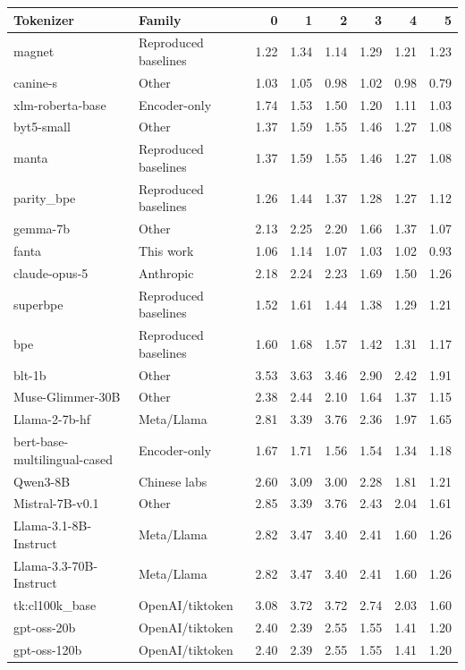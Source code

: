 \begin{tabular}{llrrrrrr}
\toprule
Tokenizer & Family & 0 & 1 & 2 & 3 & 4 & 5 \\
\midrule
magnet & Reproduced baselines & 1.22 & 1.34 & 1.14 & 1.29 & 1.21 & 1.23 \\
canine-s & Other & 1.03 & 1.05 & 0.98 & 1.02 & 0.98 & 0.79 \\
xlm-roberta-base & Encoder-only & 1.74 & 1.53 & 1.50 & 1.20 & 1.11 & 1.03 \\
byt5-small & Other & 1.37 & 1.59 & 1.55 & 1.46 & 1.27 & 1.08 \\
manta & Reproduced baselines & 1.37 & 1.59 & 1.55 & 1.46 & 1.27 & 1.08 \\
parity\_bpe & Reproduced baselines & 1.26 & 1.44 & 1.37 & 1.28 & 1.27 & 1.12 \\
gemma-7b & Other & 2.13 & 2.25 & 2.20 & 1.66 & 1.37 & 1.07 \\
fanta & This work & 1.06 & 1.14 & 1.07 & 1.03 & 1.02 & 0.93 \\
claude-opus-5 & Anthropic & 2.18 & 2.24 & 2.23 & 1.69 & 1.50 & 1.26 \\
superbpe & Reproduced baselines & 1.52 & 1.61 & 1.44 & 1.38 & 1.29 & 1.21 \\
bpe & Reproduced baselines & 1.60 & 1.68 & 1.57 & 1.42 & 1.31 & 1.17 \\
blt-1b & Other & 3.53 & 3.63 & 3.46 & 2.90 & 2.42 & 1.91 \\
Muse-Glimmer-30B & Other & 2.38 & 2.44 & 2.10 & 1.64 & 1.37 & 1.15 \\
Llama-2-7b-hf & Meta/Llama & 2.81 & 3.39 & 3.76 & 2.36 & 1.97 & 1.65 \\
bert-base-multilingual-cased & Encoder-only & 1.67 & 1.71 & 1.56 & 1.54 & 1.34 & 1.18 \\
Qwen3-8B & Chinese labs & 2.60 & 3.09 & 3.00 & 2.28 & 1.81 & 1.21 \\
Mistral-7B-v0.1 & Other & 2.85 & 3.39 & 3.76 & 2.43 & 2.04 & 1.61 \\
Llama-3.1-8B-Instruct & Meta/Llama & 2.82 & 3.47 & 3.40 & 2.41 & 1.60 & 1.26 \\
Llama-3.3-70B-Instruct & Meta/Llama & 2.82 & 3.47 & 3.40 & 2.41 & 1.60 & 1.26 \\
tk:cl100k\_base & OpenAI/tiktoken & 3.08 & 3.72 & 3.72 & 2.74 & 2.03 & 1.60 \\
gpt-oss-20b & OpenAI/tiktoken & 2.40 & 2.39 & 2.55 & 1.55 & 1.41 & 1.20 \\
gpt-oss-120b & OpenAI/tiktoken & 2.40 & 2.39 & 2.55 & 1.55 & 1.41 & 1.20 \\

\end{tabular}
